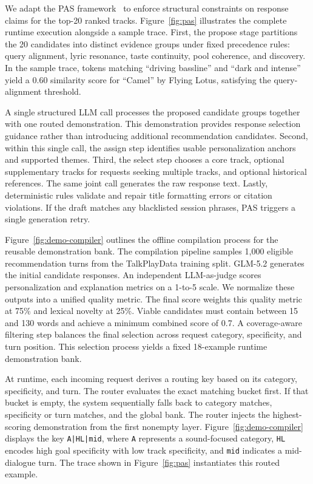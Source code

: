 \documentclass[sigconf]{acmart}
\begin{document}
We adapt the PAS framework~\cite{wang2023goalex} to enforce structural constraints on response claims for the top-20 ranked tracks. Figure~\ref{fig:pas} illustrates the complete runtime execution alongside a sample trace. First, the propose stage partitions the 20 candidates into distinct evidence groups under fixed precedence rules: query alignment, lyric resonance, taste continuity, pool coherence, and discovery. In the sample trace, tokens matching ``driving bassline'' and ``dark and intense'' yield a 0.60 similarity score for ``Camel'' by Flying Lotus, satisfying the query-alignment threshold.

A single structured LLM call processes the proposed candidate groups together with one routed demonstration. This demonstration provides response selection guidance rather than introducing additional recommendation candidates. Second, within this single call, the assign step identifies usable personalization anchors and supported themes. Third, the select step chooses a core track, optional supplementary tracks for requests seeking multiple tracks, and optional historical references. The same joint call generates the raw response text. Lastly, deterministic rules validate and repair title formatting errors or citation violations. If the draft matches any blacklisted session phrases, PAS triggers a single generation retry.

Figure~\ref{fig:demo-compiler} outlines the offline compilation process for the reusable demonstration bank. The compilation pipeline samples 1,000 eligible recommendation turns from the TalkPlayData training split. GLM-5.2 generates the initial candidate responses. An independent LLM-as-judge scores personalization and explanation metrics on a 1-to-5 scale. We normalize these outputs into a unified quality metric. The final score weights this quality metric at 75\% and lexical novelty at 25\%. Viable candidates must contain between 15 and 130 words and achieve a minimum combined score of 0.7. A coverage-aware filtering step balances the final selection across request category, specificity, and turn position. This selection process yields a fixed 18-example runtime demonstration bank.

At runtime, each incoming request derives a routing key based on its category, specificity, and turn. The router evaluates the exact matching bucket first. If that bucket is empty, the system sequentially falls back to category matches, specificity or turn matches, and the global bank. The router injects the highest-scoring demonstration from the first nonempty layer. Figure~\ref{fig:demo-compiler} displays the key \texttt{A|HL|mid}, where \texttt{A} represents a sound-focused category, \texttt{HL} encodes high goal specificity with low track specificity, and \texttt{mid} indicates a mid-dialogue turn. The trace shown in Figure~\ref{fig:pas} instantiates this routed example.
\end{document}
